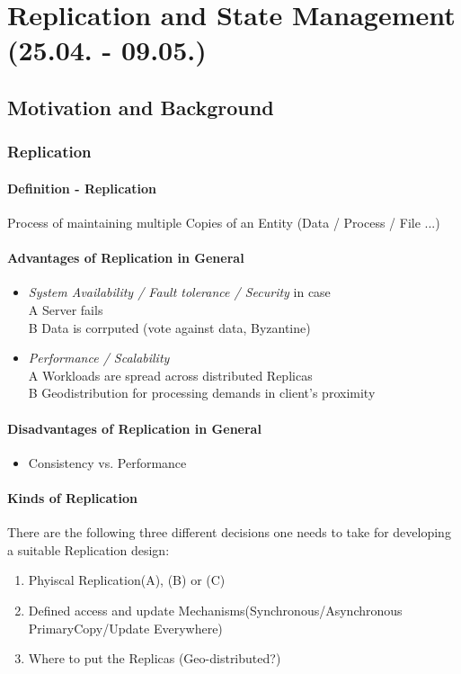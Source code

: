 \documentclass[a4paper,12pt]{article}%
\begin{document}
 \section{Replication and State Management\\ (25.04. - 09.05.)}


\subsection{Motivation and Background}

\subsubsection{Replication}
\paragraph{Definition - Replication}
Process of maintaining multiple Copies of an Entity (Data / Process / File ...)

\paragraph{Advantages of Replication in General}
\begin{itemize}
	\item {\it System Availability / Fault tolerance / Security} in case \\
	A \quad Server fails \\
	B \quad Data is corrputed (vote against data, Byzantine)
	\item {\it Performance / Scalability } \\
	A \quad Workloads are spread across distributed Replicas \\
	B \quad Geodistribution for processing demands in client's proximity
\end{itemize} 

\paragraph{Disadvantages of Replication in General}
\begin{itemize}
	\item Consistency vs. Performance
\end{itemize}
\paragraph{Kinds of Replication}
There are the following three different decisions one needs to take for developing a suitable Replication design:
\begin{enumerate}
 \item \glqq Phyiscal Replication\grqq (A), (B) or (C)
 \item Defined access and update Mechanisms(Synchronous/Asynchronous PrimaryCopy/Update Everywhere)
 \item Where to put the Replicas (Geo-distributed?)
\end{enumerate}
\end{document}

